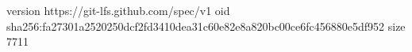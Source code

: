 version https://git-lfs.github.com/spec/v1
oid sha256:fa27301a2520250dcf2fd3410dea31c60e82e8a820bc00ce6fc456880e5df952
size 7711
